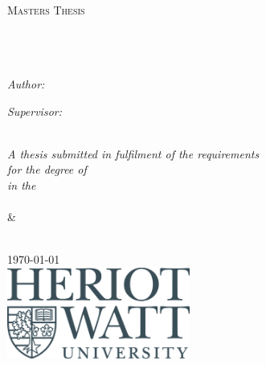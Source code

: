 \documentclass[11pt, oneside]{Thesis} %
\begin{document}
\begin{titlepage}
    \begin{center}

        \textsc{\LARGE \univname}\\[1.5cm] %
        \textsc{\Large Masters Thesis}\\[0.5cm] %

        \HRule \\[0.4cm] %
        {\huge \bfseries \ttitle}\\[0.4cm] %
        \HRule \\[1.5cm] %

        \begin{minipage}{0.4\textwidth}
            \begin{flushleft} \large
                \emph{Author:}\\
                \href{http://www.johnsmith.com}{\authornames} %
            \end{flushleft}
        \end{minipage}
        \begin{minipage}{0.4\textwidth}
            \begin{flushright} \large
                \emph{Supervisor:} \\
                \href{http://www.jamessmith.com}{\supname} %
            \end{flushright}
        \end{minipage}\\[3cm]

        \large \textit{A thesis submitted in fulfilment of the requirements\\ for the degree of \degreename}\\[0.3cm] %
        \textit{in the}\\[0.4cm]

        \deptnamefirst\\[0.4cm] %

        \&

        \deptnamesecond\\[2.0cm] %


        {\large \today}\\[1cm] %
        \includegraphics[width=6cm]{./Figures/HWUlogo.jpg} %

        \vfill
    \end{center}

\end{titlepage}
\end{document}
